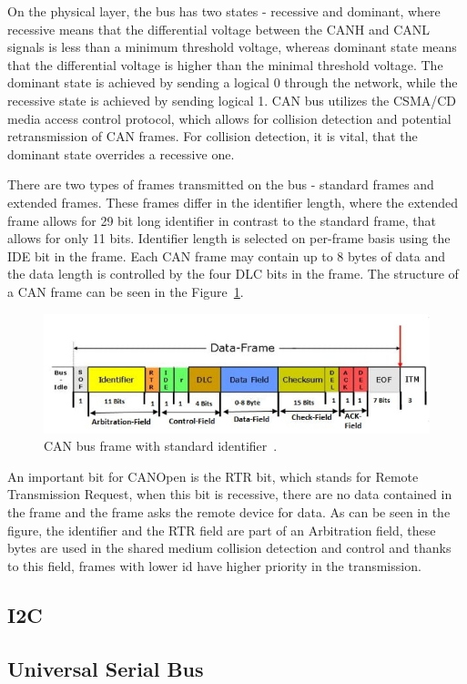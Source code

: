 On the physical layer, the bus has two states - recessive and dominant, where recessive means that the differential voltage between the CANH and CANL signals is less than a minimum threshold voltage, whereas dominant state means that the differential voltage is higher than the minimal threshold voltage.
The dominant state is achieved by sending a logical 0 through the network, while the recessive state is achieved by sending logical 1.
CAN bus utilizes the CSMA/CD media access control protocol, which allows for collision detection and potential retransmission of CAN frames.
For collision detection, it is vital, that the dominant state overrides a recessive one.

There are two types of frames transmitted on the bus - standard frames and extended frames.
These frames differ in the identifier length, where the extended frame allows for 29 bit long identifier in contrast to the standard frame, that allows for only 11 bits.
Identifier length is selected on per-frame basis using the IDE bit in the frame.
Each CAN frame may contain up to 8 bytes of data and the data length is controlled by the four DLC bits in the frame.
The structure of a CAN frame can be seen in the Figure~\ref{fig:can_frame}.

\begin{figure}[H]
    \centering
    \includegraphics[width=\textwidth]{obrazky/can_frame}
    \caption{CAN bus frame with standard identifier~\cite{piembsystech}.}
    \label{fig:can_frame}
\end{figure}

An important bit for CANOpen is the RTR bit, which stands for Remote Transmission Request, when this bit is recessive, there are no data contained in the frame and the frame asks the remote device for data.
As can be seen in the figure, the identifier and the RTR field are part of an Arbitration field, these bytes are used in the shared medium collision detection and control and thanks to this field, frames with lower id have higher priority in the transmission.

\subsection{I2C}
\label{subsec:i2c}

\subsection{Universal Serial Bus}
\label{subsec:usb}
